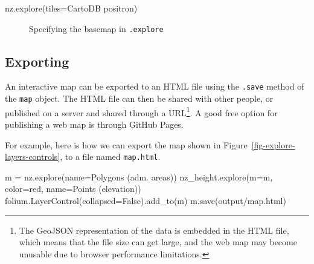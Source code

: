 \documentclass[
  letterpaper,
]{krantz}
\newenvironment{Shaded}{\begin{snugshade}}{\end{snugshade}}
\newcommand{\NormalTok}[1]{\textcolor[rgb]{0.00,0.23,0.31}{#1}}
\newcommand{\OperatorTok}[1]{\textcolor[rgb]{0.37,0.37,0.37}{#1}}
\newcommand{\StringTok}[1]{\textcolor[rgb]{0.13,0.47,0.30}{#1}}
\newcommand{\VariableTok}[1]{\textcolor[rgb]{0.07,0.07,0.07}{#1}}
\begin{document}
\begin{Shaded}
\begin{Highlighting}[]
\NormalTok{nz.explore(tiles}\OperatorTok{=}\StringTok{\textquotesingle{}CartoDB positron\textquotesingle{}}\NormalTok{)}
\end{Highlighting}
\end{Shaded}

\begin{figure}


\caption{\label{fig-explore-basemaps}Specifying the basemap in
\texttt{.explore}}

\end{figure}%

\subsection{Exporting}\label{exporting}

An interactive map can be exported to an HTML file using the
\texttt{.save} method of the \texttt{map} object. The HTML file can then
be shared with other people, or published on a server and shared through
a URL\footnote{The GeoJSON representation of the data is embedded in the
  HTML file, which means that the file size can get large, and the web
  map may become unusable due to browser performance limitations.}. A
good free option for publishing a web map is through GitHub Pages.

For example, here is how we can export the map shown in
Figure~\ref{fig-explore-layers-controls}, to a file named
\texttt{map.html}.

\begin{Shaded}
\begin{Highlighting}[]
\NormalTok{m }\OperatorTok{=}\NormalTok{ nz.explore(name}\OperatorTok{=}\StringTok{\textquotesingle{}Polygons (adm. areas)\textquotesingle{}}\NormalTok{)}
\NormalTok{nz\_height.explore(m}\OperatorTok{=}\NormalTok{m, color}\OperatorTok{=}\StringTok{\textquotesingle{}red\textquotesingle{}}\NormalTok{, name}\OperatorTok{=}\StringTok{\textquotesingle{}Points (elevation)\textquotesingle{}}\NormalTok{)}
\NormalTok{folium.LayerControl(collapsed}\OperatorTok{=}\VariableTok{False}\NormalTok{).add\_to(m)}
\NormalTok{m.save(}\StringTok{\textquotesingle{}output/map.html\textquotesingle{}}\NormalTok{)}
\end{Highlighting}
\end{Shaded}
\end{document}
